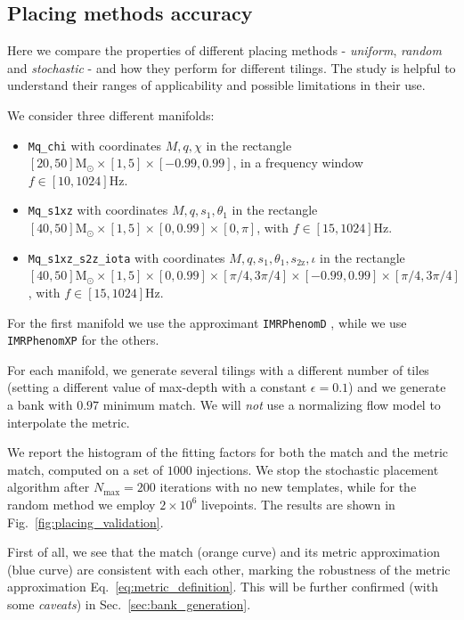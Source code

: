 \documentclass[twocolumn,showpacs,preprintnumbers,nofootinbib,prd,
superscriptaddress,10pt]{revtex4-2}
\begin{document}
\subsection{Placing methods accuracy} \label{sec:placing_accuracy}

Here we compare the properties of different placing methods - \textit{uniform}, \textit{random} and \textit{stochastic} - and how they perform for different tilings.
The study is helpful to understand their ranges of applicability and possible limitations in their use.

We consider three different manifolds:
\begin{itemize}
	\item \texttt{Mq\_chi} with coordinates $M, q, \chi $ in the rectangle $[20, 50] \mathrm{M_\odot} \times [1,5] \times [-0.99, 0.99]$, in a frequency window $f\in[10, 1024] \text{Hz}$.
	\item \texttt{Mq\_s1xz} with coordinates $M, q, s_{1}, \theta_1$ in the rectangle $[40, 50] \mathrm{M_\odot} \times [1,5] \times [0, 0.99] \times [0,\pi]$, with $f\in[15, 1024] \text{Hz}$.
	\item \texttt{Mq\_s1xz\_s2z\_iota} with coordinates $M, q, s_{1}, \theta_1, s_\text{2z}, \iota$ in the rectangle $[40, 50] \mathrm{M_\odot} \times [1,5] \times [0, 0.99] \times [\pi/4, 3\pi/4] \times [-0.99, 0.99] \times [\pi/4, 3\pi/4]$, with $f\in[15, 1024] \text{Hz}$.
\end{itemize}
For the first manifold we use the approximant \texttt{IMRPhenomD} \cite{Husa:2015iqa,Khan:2015jqa}, while we use \texttt{IMRPhenomXP} \cite{Hannam:2013oca, Khan:2018fmp, Pratten:2020ceb} for the others.

For each manifold, we generate several tilings with a different number of tiles (setting a different value of max-depth with a constant $\epsilon = 0.1$) and we generate a bank with $0.97$ minimum match.
We will {\it not} use a normalizing flow model to interpolate the metric.

We report the histogram of the fitting factors for both the match and the metric match, computed on a set of $1000$ injections.
We stop the stochastic placement algorithm after $N_\text{max} = 200$ iterations with no new templates, while for the random method we employ $2\times 10^6$ livepoints.
The results are shown in Fig.~\ref{fig:placing_validation}.

First of all, we see that the match (orange curve) and its metric approximation (blue curve) are consistent with each other, marking the robustness of the metric approximation Eq.~\eqref{eq:metric_definition}. This will be further confirmed (with some {\it caveats}) in Sec.~\ref{sec:bank_generation}.
\end{document}
